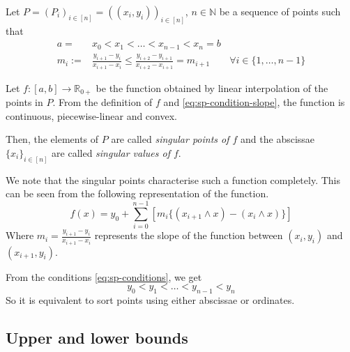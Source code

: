 \begin{dfn} \label{def:sp-sp}
	Let $ P = (P_i)_{i \in [n]} = ( (x_i, y_i) )_{i \in [n]} $, $ n \in \mathbb{N} $ be a sequence of points such that
	\begin{subequations} \label{eq:sp-conditions}
	\begin{align}
		a =& x_0 < x_1 < \dots < x_{n-1} < x_n = b \\
		\label{eq:sp-condition-slope}
		m_{i} :=& \frac{y_{i+1} - y_{i}}{x_{i+1} - x_{i}} \leq \frac{y_{i+2} - y_{i+1}}{x_{i+2} - x_{i+1}} = m_{i+1} \qquad \forall i \in \{ 1, \dots, n-1 \}
	\end{align}
	\end{subequations}
	
	Let $ f:[a,b] \to \mathbb{R}_{0+} $ be the function obtained by linear interpolation of the points in $P$. From the definition of $f$ and  \ref{eq:sp-condition-slope}, the function is continuous, piecewise-linear and convex.
	
	Then, the elements of $P$ are called \emph{singular points of $f$} and the abscissae $ \{ x_i \}_{i \in [n]} $ are called \emph{singular values of $f$}.
\end{dfn}


\begin{rem} \label{rem:sp-characterisation}
	We note that the singular points characterise such a function completely. This can be seen from the following representation of the function.
	\begin{equation}
	\label{eq:sp-function-repr}
	f(x) = y_0 + \sum_{i=0}^{n-1} [ m_i \{ (x_{i+1} \wedge x) - (x_{i} \wedge x) \} ]
	\end{equation}
	Where $ m_i = \frac{y_{i+1} - y_{i}}{x_{i+1} - x_{i}} $ represents the slope of the function between $ (x_{i}, y_{i}) $ and $ (x_{i+1}, y_{i}) $.
\end{rem}

\begin{rem}
	From the conditions \ref{eq:sp-conditions}, we get
	\begin{equation*}
		y_0 < y_1 < \dots < y_{n-1} < y_n
	\end{equation*}
	So it is equivalent to sort points using either abscissae or ordinates.
\end{rem}



\subsection{Upper and lower bounds}

